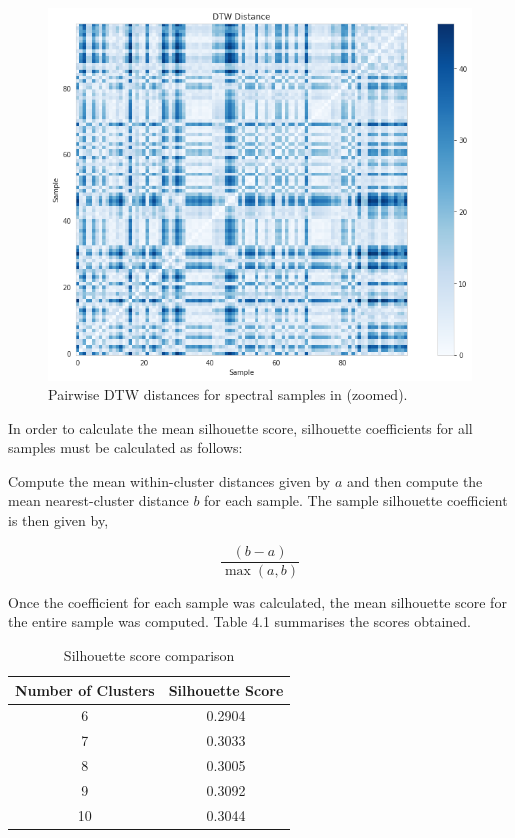\begin{figure}[!htb]
\centering
\includegraphics[scale=0.60]{figures/dtw cotar zoomed.png}
\caption{Pairwise DTW distances for spectral samples in \citet{vcotar2021galah} (zoomed).}
\end{figure}

In order to calculate the mean silhouette score, silhouette coefficients for all samples must be calculated as follows:

Compute the mean within-cluster distances given by $a$ and then compute the mean nearest-cluster distance $b$ for each sample. The sample silhouette coefficient is then given by,

\begin{equation}
\frac{(b-a)}{\max_{}(a,b)}
\end{equation}

Once the coefficient for each sample was calculated, the mean silhouette score for the entire sample was computed. Table 4.1 summarises the scores obtained.

\begin{table}[]
\begin{center}
\begin{tabular}{|c|c|}
\hline
\textbf{Number of Clusters} & \textbf{Silhouette Score} \\ \hline
6                     & 0.2904                    \\ \hline
7                     & 0.3033                    \\ \hline
8                     & 0.3005                    \\ \hline
9                     & 0.3092                    \\ \hline
10                    & 0.3044                    \\ \hline
\end{tabular}
\caption{Silhouette score comparison}
\label{table:Silhouette Score}
\end{center}
\end{table}

